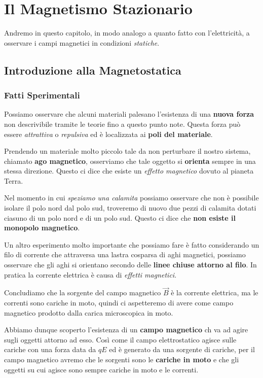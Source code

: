 \chapter{Il Magnetismo Stazionario}

Andremo in questo capitolo, in modo analogo a quanto fatto con l'elettricità, a osservare i campi magnetici in condizioni \textit{statiche}. 

\section{Introduzione alla Magnetostatica}

\subsection{Fatti Sperimentali}
Possiamo osservare che alcuni materiali palesano l'esistenza di una \textbf{nuova forza} non descrivibile tramite le teorie fino a questo punto note. Questa forza può essere \textit{attrattiva} o \textit{repulsiva} ed è localizzata ai \textbf{poli del materiale}. 

Prendendo un materiale molto piccolo tale da non perturbare il nostro sistema, chiamato \textbf{ago magnetico}, osserviamo che tale oggetto si \textbf{orienta} sempre in una stessa direzione. Questo ci dice che esiste un \textit{effetto magnetico} dovuto al pianeta Terra. 

Nel momento in cui \textit{speziamo una calamita} possiamo osservare che non è possibile isolare il polo nord dal polo sud, troveremo di nuovo due pezzi di calamita dotati ciasuno di un polo nord e di un polo sud. Questo ci dice che \textbf{non esiste il monopolo magnetico}.

Un altro esperimento molto importante che possiamo fare è fatto considerando un filo di corrente che attraversa una lastra cosparsa di aghi magnetici, possiamo osservare che gli aghi si orientano secondo delle \textbf{linee chiuse attorno al filo}. In pratica la corrente elettrica è causa di \textit{effetti magnetici}.

Concludiamo che la sorgente del campo magnetico $\vec{B}$ è la corrente elettrica, ma le correnti sono cariche in moto, quindi ci aspetteremo di avere come campo magnetico prodotto dalla carica microscopica in moto. 

Abbiamo dunque scoperto l'esistenza di un \textbf{campo magnetico} ch va ad agire sugli oggetti attorno ad esso. Così come il campo elettrostatico agisce sulle cariche con una forza data da $qE$ ed è generato da una sorgente di cariche, per il campo magnetico avremo che le sorgenti sono le \textbf{cariche in moto} e che gli oggetti su cui agisce sono sempre cariche in moto e le correnti.

